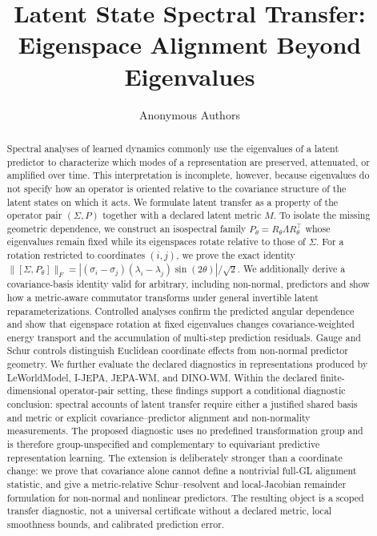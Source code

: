 \documentclass{article}
\title{Latent State Spectral Transfer:\\Eigenspace Alignment Beyond Eigenvalues}
\author{Anonymous Authors}
\date{}
\begin{document}
\maketitle

\begin{abstract}
Spectral analyses of learned dynamics commonly use the eigenvalues of a latent predictor to characterize which modes of a representation are preserved, attenuated, or amplified over time. This interpretation is incomplete, however, because eigenvalues do not specify how an operator is oriented relative to the covariance structure of the latent states on which it acts. We formulate latent transfer as a property of the operator pair $(\Sigma,P)$ together with a declared latent metric $M$. To isolate the missing geometric dependence, we construct an isospectral family $P_\theta=R_\theta\Lambda R_\theta^\top$ whose eigenvalues remain fixed while its eigenspaces rotate relative to those of $\Sigma$. For a rotation restricted to coordinates $(i,j)$, we prove the exact identity $\|[\Sigma,P_\theta]\|_F=|(\sigma_i-\sigma_j)(\lambda_i-\lambda_j)\sin(2\theta)|/\sqrt{2}$. We additionally derive a covariance-basis identity valid for arbitrary, including non-normal, predictors and show how a metric-aware commutator transforms under general invertible latent reparameterizations. Controlled analyses confirm the predicted angular dependence and show that eigenspace rotation at fixed eigenvalues changes covariance-weighted energy transport and the accumulation of multi-step prediction residuals. Gauge and Schur controls distinguish Euclidean coordinate effects from non-normal predictor geometry. We further evaluate the declared diagnostics in representations produced by LeWorldModel, I-JEPA, JEPA-WM, and DINO-WM. Within the declared finite-dimensional operator-pair setting, these findings support a conditional diagnostic conclusion: spectral accounts of latent transfer require either a justified shared basis and metric or explicit covariance--predictor alignment and non-normality measurements. The proposed diagnostic uses no predefined transformation group and is therefore group-unspecified and complementary to equivariant predictive representation learning.
The extension is deliberately stronger than a coordinate change: we prove that
covariance alone cannot define a nontrivial full-GL alignment statistic, and
give a metric-relative Schur--resolvent and local-Jacobian remainder
formulation for non-normal and nonlinear predictors. The resulting object is a
scoped transfer diagnostic, not a universal certificate without a declared
metric, local smoothness bounds, and calibrated prediction error.
\end{abstract}
\end{document}
